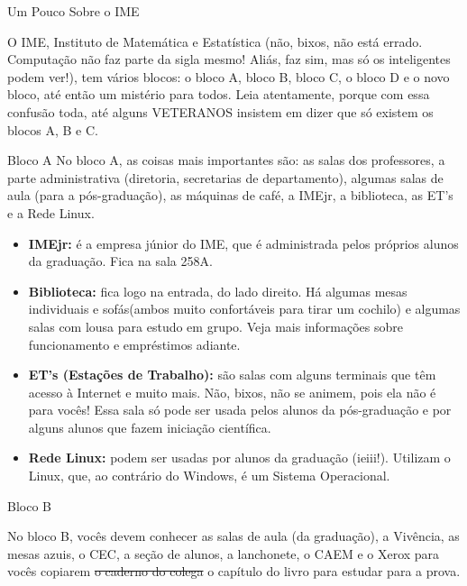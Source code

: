 \begin{secao}{Um Pouco Sobre o IME}

O IME, Instituto de Matemática e Estatística (não, bixos, não está errado.
Computação não faz parte da sigla mesmo! Aliás, faz sim, mas só os inteligentes
podem ver!), tem vários blocos: o bloco A, bloco B, bloco C, o bloco D e o
novo bloco, até então um mistério para todos. Leia atentamente, porque com essa
confusão toda, até alguns VETERANOS insistem em dizer que só existem os blocos
A, B e C.


\begin{subsecao}{Bloco A}
No bloco A, as coisas mais importantes são: as salas dos professores, a parte
administrativa (diretoria, secretarias de departamento), algumas salas de aula
(para a pós-graduação), as máquinas de café, a IMEjr, a biblioteca, as ET's e
a Rede Linux.

\begin{itemize}

\item {\bf IMEjr:} é a empresa júnior do IME, que é administrada pelos próprios
alunos da graduação. Fica na sala 258A.

\item {\bf Biblioteca:} fica logo na entrada, do lado direito. Há algumas mesas
individuais e sofás(ambos muito confortáveis para tirar um cochilo) e algumas salas
com lousa para estudo em grupo. Veja mais informações sobre funcionamento e
empréstimos adiante.

\item {\bf ET's (Estações de Trabalho):} são salas com alguns terminais que têm
acesso à Internet e muito mais. Não, bixos, não se animem, pois ela não é para
vocês! Essa sala só pode ser usada pelos alunos da pós-graduação e por alguns
alunos que fazem iniciação científica.

\item {\bf Rede Linux:} podem ser usadas por alunos da graduação (ieiii!).
Utilizam o Linux, que, ao contrário do Windows, é um Sistema Operacional.

\end{itemize}


\end{subsecao}

\begin{subsecao}{Bloco B}


No bloco B, vocês devem conhecer as salas de aula (da graduação), a Vivência, as
mesas azuis, o CEC, a seção de alunos, a lanchonete, o CAEM e o Xerox para vocês
copiarem \sout{o caderno do colega} o capítulo do livro para estudar para a prova.


\end{subsecao}
\end{secao}
